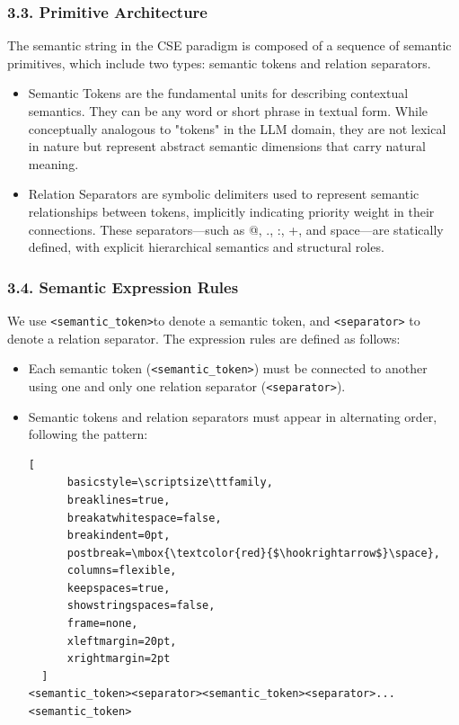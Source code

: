 \documentclass[conference]{IEEEtran}
\begin{document}
\subsubsection{3.3. Primitive
Architecture}\label{33-primitive-architecture}

The semantic string in the CSE paradigm is composed of a sequence of
semantic primitives, which include two types: semantic tokens and
relation separators.

\begin{itemize}
\item
  Semantic Tokens are the fundamental units for describing contextual
  semantics. They can be any word or short phrase in textual form. While
  conceptually analogous to "tokens" in the LLM domain, they are not
  lexical in nature but represent abstract semantic dimensions that
  carry natural meaning.
\item
  Relation Separators are symbolic delimiters used to represent semantic
  relationships between tokens, implicitly indicating priority weight in
  their connections. These separators---such as @, ., :, +, and
  space---are statically defined, with explicit hierarchical semantics
  and structural roles.
\end{itemize}

\subsubsection{3.4. Semantic Expression
Rules}\label{34-semantic-expression-rules}

We use \texttt{\textless{}semantic\_token\textgreater{}}to denote a
semantic token, and \texttt{\textless{}separator\textgreater{}} to
denote a relation separator. The expression rules are defined as
follows:

\begin{itemize}
\item
  \begin{sloppypar}
  Each semantic token
  (\texttt{<semantic\_token>}) must be connected
  to another using one and only one relation separator
  (\texttt{<separator>}).
  \end{sloppypar}
\item
  \begin{sloppypar}
  Semantic tokens and relation separators must appear in alternating
  order, following the pattern:
  \end{sloppypar}
  
  \begin{lstlisting}[
      basicstyle=\scriptsize\ttfamily,
      breaklines=true,
      breakatwhitespace=false,
      breakindent=0pt,
      postbreak=\mbox{\textcolor{red}{$\hookrightarrow$}\space},
      columns=flexible,
      keepspaces=true,
      showstringspaces=false,
      frame=none,
      xleftmargin=20pt,
      xrightmargin=2pt
  ]
<semantic_token><separator><semantic_token><separator>...<semantic_token>
  \end{lstlisting}
\end{itemize}
\end{document}
